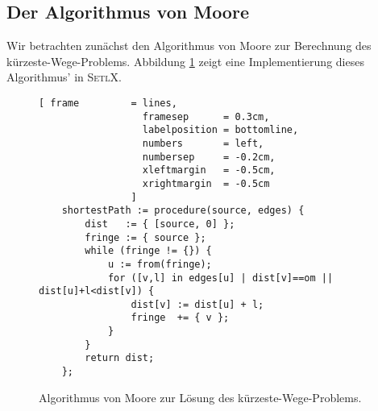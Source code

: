 \subsection[Moore's Algorithm]{Der Algorithmus von Moore}
Wir betrachten zun\"achst den Algorithmus von Moore \cite{moore:59} zur Berechnung des k\"urzeste-Wege-Problems.
Abbildung \ref{fig:moore.stlx} zeigt eine Implementierung dieses Algorithmus' in \textsc{SetlX}.

\begin{figure}[!ht]
  \centering
\begin{Verbatim}[ frame         = lines, 
                  framesep      = 0.3cm, 
                  labelposition = bottomline,
                  numbers       = left,
                  numbersep     = -0.2cm,
                  xleftmargin   = -0.5cm,
                  xrightmargin  = -0.5cm
                ]
    shortestPath := procedure(source, edges) {
        dist   := { [source, 0] };
        fringe := { source };
        while (fringe != {}) {
            u := from(fringe);
            for ([v,l] in edges[u] | dist[v]==om || dist[u]+l<dist[v]) {
                dist[v] := dist[u] + l;
                fringe  += { v };
            }
        }
        return dist;
    };
\end{Verbatim}
\vspace*{-0.3cm}
  \caption{Algorithmus von Moore zur L\"osung des k\"urzeste-Wege-Problems.}
  \label{fig:moore.stlx}
\end{figure} 

